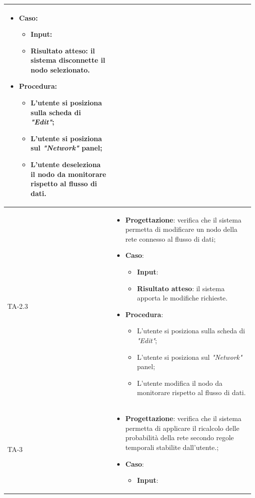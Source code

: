\begin{longtable}{|C{2.5cm}|C{13cm}|}
\begin{itemize}
	\item \textbf{Caso}: 
	\begin{itemize}
		\item \textbf{Input}:
		\item \textbf{Risultato atteso}: il sistema disconnette il nodo selezionato.
	\end{itemize}
	\item \textbf{Procedura}:
	\begin{itemize}
		\item L'utente si posiziona sulla scheda di \emph{"Edit"};
		\item L'utente si posiziona sul \emph{"Network"} panel;
		\item L'utente deseleziona il nodo da monitorare rispetto al flusso di dati.
	\end{itemize} 
\end{itemize} \\
\hline
{TA-2.3} &
\begin{itemize}
	\item \textbf{Progettazione}: verifica che il sistema permetta di modificare un nodo della rete connesso al flusso di dati;
	\item \textbf{Caso}: 
	\begin{itemize}
		\item \textbf{Input}: 
		\item \textbf{Risultato atteso}: il sistema apporta le modifiche richieste.
	\end{itemize}
	\item \textbf{Procedura}:
	\begin{itemize}
		\item L'utente si posiziona sulla scheda di \emph{"Edit"};
		\item L'utente si posiziona sul \emph{"Network"} panel;
		\item L'utente modifica il nodo da monitorare rispetto al flusso di dati.
	\end{itemize} 
\end{itemize}\\
\hline
{TA-3} &
\begin{itemize}
	\item \textbf{Progettazione}: verifica che il sistema permetta di applicare il
	ricalcolo delle probabilità della rete
	secondo regole temporali stabilite dall'utente.;
	\item \textbf{Caso}: 
	\begin{itemize}
		\item \textbf{Input}: 

\end{itemize}
\end{itemize}
\end{longtable}
